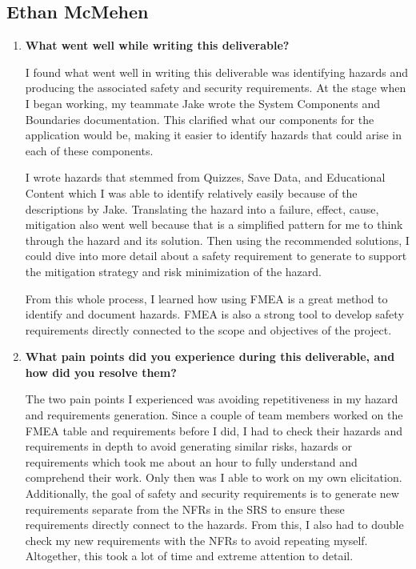 \documentclass{article}
\newcounter{hazard}
\begin{document}
\subsection*{Ethan McMehen}

\begin{enumerate}
  \item \textbf{What went well while writing this deliverable?}
  
  I found what went well in writing this deliverable was identifying hazards and 
  producing the associated safety and security requirements. At the stage when I 
  began working, my teammate Jake wrote the System Components and Boundaries 
  documentation. This clarified what our components for the application would be, 
  making it easier to identify hazards that could arise in each of these components.
  
  I wrote hazards that stemmed from Quizzes, Save Data, and Educational Content which I 
  was able to identify relatively easily because of the descriptions by Jake. Translating 
  the hazard into a failure, effect, cause, mitigation also went well because that is 
  a simplified pattern for me to think through the hazard and its solution. Then using 
  the recommended solutions, I could dive into more detail about a safety requirement 
  to generate to support the mitigation strategy and risk minimization of the hazard.

  From this whole process, I learned how using FMEA is a great method to identify and 
  document hazards. FMEA is also a strong tool to develop safety requirements directly 
  connected to the scope and objectives of the project.
  \item \textbf{What pain points did you experience during this deliverable,
  and how did you resolve them?}

  The two pain points I experienced was avoiding repetitiveness in my hazard and 
  requirements generation. Since a couple of team members worked on the FMEA table and 
  requirements before I did, I had to check their hazards and requirements in depth to 
  avoid generating similar risks, hazards or requirements which took me about an hour 
  to fully understand and comprehend their work. Only then was I able to work on my own 
  elicitation. Additionally, the goal of safety and security requirements is to generate 
  new requirements separate from the NFRs in the SRS to ensure these requirements 
  directly connect to the hazards. From this, I also had to double check my new 
  requirements with the NFRs to avoid repeating myself. Altogether, this took a lot of 
  time and extreme attention to detail.


\end{enumerate}
\end{document}
